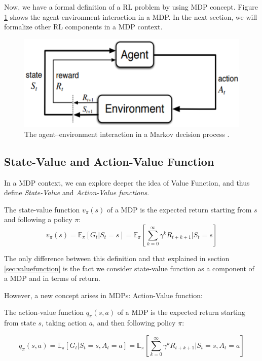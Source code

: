 Now, we have a formal definition of a RL problem by using MDP concept. Figure \ref{fig:mdprlsystem} shows the agent-environment interaction in a MDP. In the next section, we will formalize other RL components in a MDP context.

\begin{figure}[ht!]
	\centering
	\includegraphics[scale=0.5]{Cap4/mdprlsystem.eps}
	\caption{The agent–environment interaction in a Markov decision process \cite{sutton1998rli}.}
	\label{fig:mdprlsystem}
\end{figure}

\subsection{State-Value and Action-Value Function}

In a MDP context, we can explore deeper the idea of Value Function, and thus define \textit{State-Value} and \textit{Action-Value functions}.

\begin{definition}\label{def:statevalue}
	The state-value function $v_{\pi}(s)$ of a MDP is the expected return starting from $s$ and following a policy $\pi$:
	\begin{equation}
	v_{\pi}(s) = \mathbb{E}_{\pi} [G_{t} \big| S_{t} = s] = \mathbb{E}_{\pi} \left[ \sum_{k = 0}^{\infty} \gamma^{k} R_{t + k + 1} \Bigg| S_{t} = s \right]  
	\end{equation}
\end{definition}

The only difference between this definition and that explained in section \ref{sec:valuefunction} is the fact we consider state-value function as a component of a MDP and in terms of return.

However, a new concept arises in MDPs: Action-Value function:

\begin{definition}\label{def:actionvalue}
	The action-value function $q_{\pi}(s,a)$ of a MDP is the expected return starting from state $s$, taking action $a$, and then following policy $\pi$:
	
	\begin{equation}
	q_{\pi}(s,a) = \mathbb{E}_{\pi} [G_{t} | S_{t} = s, A_{t} = a] = \mathbb{E}_{\pi} \left[ \sum_{k = 0}^{\infty} \gamma^{k} R_{t + k + 1} \Bigg| S_{t} = s, A_{t} = a \right] 
	\end{equation}
\end{definition}

